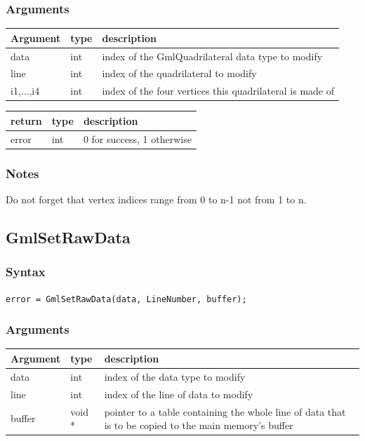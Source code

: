 \documentclass[a4paper,12pt]{article}
\begin{document}
\subsubsection*{Arguments}

\begin{tabular}{|m{2cm}|m{1.5cm}|m{10.5cm}|}
\hline
Argument   & type   & description \\
\hline
data       & int    & index of the GmlQuadrilateral data type to modify \\
\hline
line       & int    & index of the quadrilateral to modify \\
\hline
i1,...,i4  & int    & index of the four vertices this quadrilateral is made of \\
\hline
\end{tabular}

\medskip

\begin{tabular}{|m{2cm}|m{1.5cm}|m{10.5cm}|}
\hline
return     & type   & description \\
\hline
error      & int    & 0 for success, 1 otherwise \\
\hline
\end{tabular}
\subsubsection*{Notes}
Do not forget that vertex indices range from 0 to n-1 not from 1 to n.


\subsection{GmlSetRawData}
\subsubsection*{Syntax}

{\tt error = GmlSetRawData(data, LineNumber, buffer);}
\subsubsection*{Arguments}

\begin{tabular}{|m{2cm}|m{1.5cm}|m{10.5cm}|}
\hline
Argument   & type   & description \\
\hline
data       & int    & index of the data type to modify \\
\hline
line       & int    & index of the line of data to modify \\
\hline
buffer     & void * & pointer to a table containing the whole line of data that is to be copied to the main memory's buffer \\
\hline
\end{tabular}
\end{document}
